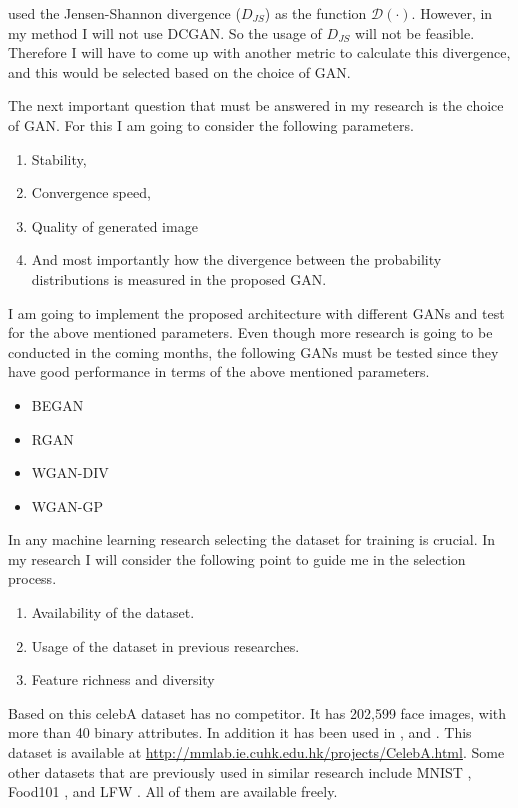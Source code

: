 \documentclass[../main/main.tex]{subfiles}
\begin{document}
	 used the Jensen-Shannon divergence ($D_{JS}$) as the function $\mathcal{D}(\cdot)$. However, in my method I will not use \gls{DCGAN}. So the usage of $D_{JS}$ will not be feasible. Therefore I will have to come up with another metric to calculate this divergence, and this would be selected based on the choice of \gls{GAN}.  
	
	The next important question that must be answered in my research is the choice of \gls{GAN}. For this I am going to consider the following parameters. 
	\begin{enumerate}
		\item Stability,
		\item Convergence speed,
		\item Quality of  generated image 
		\item And most importantly how the divergence between the probability distributions is measured in the proposed \gls{GAN}.
	\end{enumerate}

	I am going to implement the proposed architecture with different \gls{GAN}s and test for the above mentioned parameters. Even though more research is going to be conducted in the coming months, the following \gls{GAN}s must be tested since they have good performance in terms of the above mentioned parameters. 
	\begin{itemize}
		\item \gls{BEGAN}  
		\item \gls{RGAN} 
		\item  \gls{WGAN-DIV} 
		\item \gls{WGAN-GP} 
	\end{itemize}

	In any machine learning research selecting the dataset for training is crucial. In my research I will consider the following point to guide me in the selection process. 
	
	\begin{enumerate}
		\item Availability of the dataset.
		\item Usage of the dataset in previous researches.
		\item Feature richness and diversity
	\end{enumerate}
	Based on this celebA  dataset has no competitor.  It has 202,599 face images, with more than 40 binary attributes. In addition it has been used in ,  and . This dataset is available at \url{http://mmlab.ie.cuhk.edu.hk/projects/CelebA.html}. Some other datasets that are previously used in similar research include MNIST , Food101 , and LFW . All of them are available freely. 
	
\end{document}
